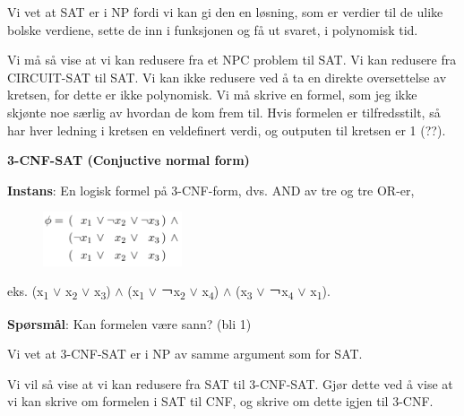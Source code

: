 \documentclass[12pt]{report}
\begin{document}
\vspace{\baselineskip}
Vi vet at SAT er i NP fordi vi kan gi den en løsning, som er verdier til de ulike bolske verdiene, sette de inn i funksjonen og få ut svaret, i polynomisk tid. \par

Vi må så vise at vi kan redusere fra et NPC problem til SAT. Vi kan redusere fra CIRCUIT-SAT til SAT. Vi kan ikke redusere ved å ta en direkte oversettelse av kretsen, for dette er ikke polynomisk. Vi må skrive en formel, som jeg ikke skjønte noe særlig av hvordan de kom frem til. Hvis formelen er tilfredsstilt, så har hver ledning i kretsen en veldefinert verdi, og outputen til kretsen er 1 (??). \par


\vspace{\baselineskip}
\textbf{3-CNF-SAT (Conjuctive normal form)} \par

\textbf{Instans}: En logisk formel på 3-CNF-form, dvs. AND av tre og tre OR-er, \par




\begin{figure}[H]
\advance\leftskip 4.72in		\includegraphics[width=1.62in,height=0.63in]{./media/image160.png}
\end{figure}



eks. (x\textsubscript{1} $ \vee $  x\textsubscript{2} $ \vee $  x\textsubscript{3}) $\wedge$  (x\textsubscript{1} $ \vee $  ￢x\textsubscript{2} $ \vee $  x\textsubscript{4}) $\wedge$  (x\textsubscript{3} $ \vee $  ￢x\textsubscript{4} $ \vee $  x\textsubscript{1}).\par

\textbf{Spørsmål}: Kan formelen være sann? (bli 1)\par


\vspace{\baselineskip}
Vi vet at 3-CNF-SAT er i NP av samme argument som for SAT. \par

Vi vil så vise at vi kan redusere fra SAT til 3-CNF-SAT. Gjør dette ved å vise at vi kan skrive om formelen i SAT til CNF, og skrive om dette igjen til 3-CNF. \par
\end{document}
